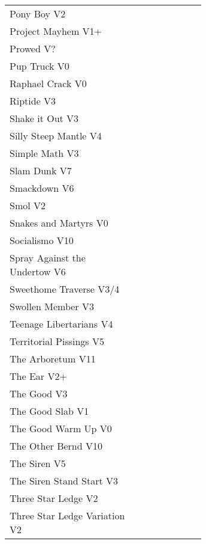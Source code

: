 \begin{flushleft}
\begin{center}
\begin{supertabular}{p{0.65\linewidth}r}
Pony Boy V2 & \pageref{rt:Pony Boy} \\
Project Mayhem V1+ & \pageref{rt:Project Mayhem} \\
Prowed V? & \pageref{vr:Prowed} \\
Pup Truck V0 & \pageref{rt:Pup Truck} \\
Raphael Crack V0 & \pageref{rt:Raphael Crack} \\
Riptide V3 & \pageref{rt:Riptide} \\
Shake it Out V3 & \pageref{vr:Shake it Out} \\
Silly Steep Mantle V4 & \pageref{rt:Silly Steep Mantle} \\
Simple Math V3 & \pageref{rt:Simple Math} \\
Slam Dunk V7 & \pageref{rt:Slam Dunk} \\
Smackdown V6 & \pageref{rt:Smackdown} \\
Smol V2 & \pageref{rt:Smol} \\
Snakes and Martyrs V0 & \pageref{rt:Snakes and Martyrs} \\
Socialismo V10 & \pageref{rt:Socialismo} \\
Spray Against the Undertow V6 & \pageref{vr:Spray Against the Undertow} \\
Sweethome Traverse V3/4 & \pageref{vr:Sweethome Traverse} \\
Swollen Member V3 & \pageref{rt:Swollen Member} \\
Teenage Libertarians V4 & \pageref{rt:Teenage Libertarians} \\
Territorial Pissings V5 & \pageref{rt:Territorial Pissings} \\
The Arboretum V11 & \pageref{rt:The Arboretum} \\
The Ear V2+ & \pageref{rt:The Ear} \\
The Good V3 & \pageref{rt:The Good} \\
The Good Slab V1 & \pageref{rt:The Good Slab} \\
The Good Warm Up V0 & \pageref{rt:The Good Warm Up} \\
The Other Bernd V10 & \pageref{rt:The Other Bernd} \\
The Siren V5 & \pageref{rt:The Siren} \\
The Siren Stand Start V3 & \pageref{vr:The Siren Stand Start} \\
Three Star Ledge V2 & \pageref{rt:Three Star Ledge} \\
Three Star Ledge Variation V2 & \pageref{vr:Three Star Ledge Variation} \\

\end{supertabular}
\end{center}
\end{flushleft}
